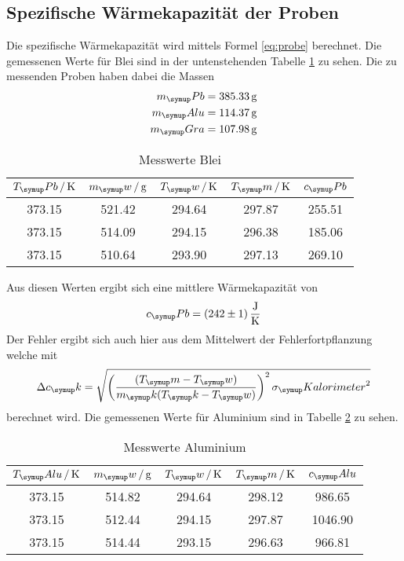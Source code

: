 \subsection{Spezifische Wärmekapazität der Proben}
Die spezifische Wärmekapazität wird mittels Formel \eqref{eq:probe} berechnet.
Die gemessenen Werte für Blei sind in der untenstehenden Tabelle \ref{tab:pb}
zu sehen.
Die zu messenden Proben haben dabei die Massen
\begin{align*}
m_\su{Pb} &= 385.33\gr \\
m_\su{Alu}&= 114.37\gr \\
m_\su{Gra}&= 107.98\gr
\end{align*}
\begin{table}
  \centering
  \begin{tabular}{c c c c c}
    \toprule
    $T_\su{Pb}\,/\Kel$ & $m_\su{w}\,/\gr$ & $T_\su{w}\,/\Kel
    $ & $T_\su{m}\,/\Kel$ & $c_\su{Pb}$\\
    \midrule
    373.15 & 521.42 & 294.64 & 297.87 & 255.51 \\
    373.15 & 514.09 & 294.15 & 296.38 & 185.06 \\
    373.15 & 510.64 & 293.90 & 297.13 & 269.10 \\
    \bottomrule
  \end{tabular}
  \caption{Messwerte Blei}
  \label{tab:pb}
\end{table}
Aus diesen Werten ergibt sich eine mittlere Wärmekapazität von
\begin{equation*}
  c_\su{Pb}=(242\pm1)\,\si{\joule\per\kelvin}
\end{equation*}
Der Fehler ergibt sich auch hier aus dem Mittelwert der Fehlerfortpflanzung
welche mit
\begin{equation}
  \Delta c_\su{k} = \sqrt{\left(\frac{(T_\su{m}-T_\su{w})}{m_\su{k}
  (T_\su{k}-T_\su{w})}\right)^2\sigma_\su{Kalorimeter}^2}
  \label{eq:gauss}
\end{equation}
berechnet wird.
Die gemessenen Werte für Aluminium sind in Tabelle \ref{tab:alu} zu sehen.
\begin{table}
  \centering
  \begin{tabular}{c c c c c}
    \toprule
    $T_\su{Alu}\,/\Kel$ & $m_\su{w}\,/\gr$ & $T_\su{w}\,/\Kel
    $ & $T_\su{m}\,/\Kel$ & $c_\su{Alu}$\\
    \midrule
    373.15 & 514.82 & 294.64 & 298.12 & 986.65\\
    373.15 & 512.44 & 294.15 & 297.87 &1046.90 \\
    373.15 & 514.44 & 293.15 & 296.63 & 966.81\\
    \bottomrule
  \end{tabular}
  \caption{Messwerte Aluminium}
  \label{tab:alu}
\end{table}
